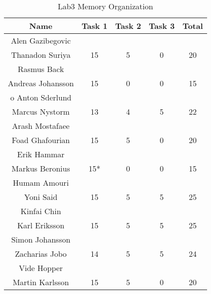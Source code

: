 \documentclass{article}
\begin{document}
\begin{table}[ht]
\caption{Lab3 Memory Organization}
\centering
\begin{tabular}{c c c c c} 
\hline\hline 
Name & Task 1 & Task 2 & Task 3 & Total \\ [0.5ex] 
\hline
Alen Gazibegovic \\ Thanadon Suriya 
& 15 & 5 & 0 & 20 \\
\hline
Rasmus Back \\ Andreas Johansson 
& 15 & 0 & 0 & 15 \\
\hline o
Anton Sderlund \\ Marcus Nystorm
& 13 & 4 & 5 & 22 \\
\hline
Arash Mostafaee \\ Foad Ghafourian
& 15 & 5 & 0 & 20 \\
\hline
Erik Hammar \\ Markus Beronius
& 15* & 0 & 0 & 15 \\
\hline 
Humam Amouri \\ Yoni Said
& 15 & 5 & 5 & 25 \\ 
\hline
Kinfai Chin \\ Karl Eriksson
& 15 & 5 & 5 & 25 \\ 
\hline
Simon Johansson \\ Zacharias Jobo
& 14 & 5 & 5 & 24 \\
\hline
Vide Hopper \\ Martin Karlsson
& 15 & 5 & 0 & 20 \\ [1ex]
\hline
\end{tabular}
\label{table:nonlin}
\end{table}


\end{document}
